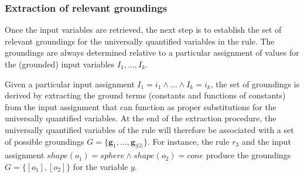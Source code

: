 


\subsubsection*{Extraction of relevant groundings}

Once the input variables are retrieved, the next step is to establish the set of relevant groundings for the universally quantified variables in the rule.  The groundings are always determined relative to a particular assignment of values for the (grounded) input variables $I_1, \dots, I_k$. 

Given a particular input assignment $I_1\!=\!i_1 \land \dots \land I_k\!=\!i_k$, the set of groundings is derived by extracting the ground terms (constants and functions of constants) from the input assignment that can function as proper substitutions for the universally quantified variables. At the end of the extraction procedure, the universally quantified variables of the rule will therefore be associated with a set of possible groundings $G = \{\mathbf{g}_1, \dots, \mathbf{g}_{|G|}\}$.  For instance, the rule $r_3$ and the input assignment $ \mathit{shape}(o_1)\!=\!\mathit{sphere} \land \mathit{shape}(o_2)\!=\!\mathit{cone}$ produce the groundings $G= \{[o_1], [o_2]\}$ for the variable $y$. 

